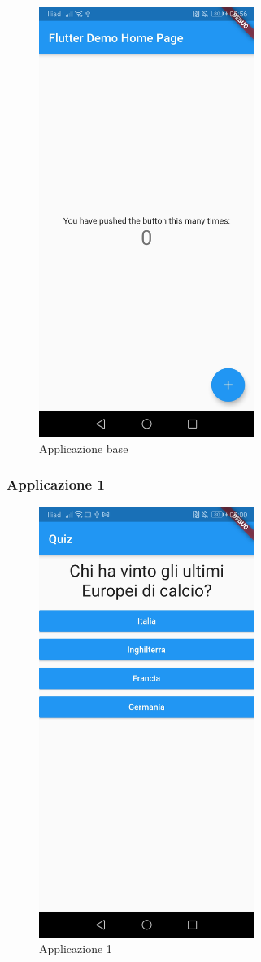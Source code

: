 \begin{figure}[htbp]	
	\centering
	\includegraphics[width=7cm]{immagini/base.jpeg}
	\caption{Applicazione base}
	\label{fig:Applicazione base}
\end{figure}

\newpage

\subsubsection{Applicazione 1}


\begin{figure}[htbp]	
	\centering
	\includegraphics[width=7cm]{immagini/app1.jpeg}
	\caption{Applicazione 1}
	\label{fig:Applicazione 1}
\end{figure}

